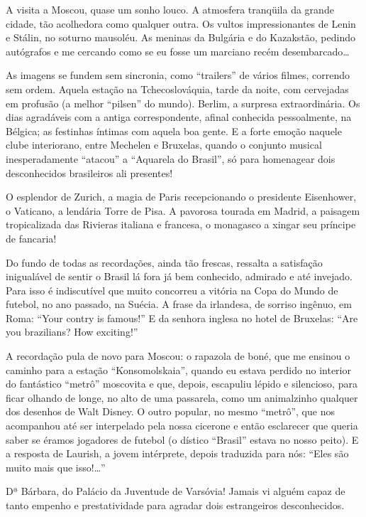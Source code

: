 A visita a Moscou, quase um sonho louco. A atmosfera tranqüila da grande cidade, tão acolhedora como qualquer outra. Os vultos impressionantes de Lenin e Stálin, no soturno mausoléu. As meninas da Bulgária e do Kazakstão, pedindo autógrafos e me cercando como se eu fosse um marciano recém desembarcado\ldots

As imagens se fundem sem sincronia, como “trailers” de vários filmes, correndo sem ordem. Aquela estação na Tchecoslováquia, tarde da noite, com cervejadas em profusão (a melhor “pilsen” do mundo). Berlim, a surpresa extraordinária. Os dias agradáveis com a antiga correspondente, afinal conhecida pessoalmente, na Bélgica; as festinhas íntimas com aquela boa gente. E a forte emoção naquele clube interiorano, entre Mechelen e Bruxelas, quando o conjunto musical inesperadamente “atacou” a “Aquarela do Brasil”, só para homenagear dois desconhecidos brasileiros ali presentes!

O esplendor de Zurich, a magia de Paris recepcionando o presidente Eisenhower, o Vaticano, a lendária Torre de Pisa. A pavorosa tourada em Madrid, a paisagem tropicalizada das Rivieras italiana e francesa, o monagasco a xingar seu príncipe de fancaria!

Do fundo de todas as recordações, ainda tão frescas, ressalta a satisfação inigualável de sentir o Brasil lá fora já bem conhecido, admirado e até invejado. Para isso é indiscutível que muito concorreu a vitória na Copa do Mundo de futebol, no ano passado, na Suécia. A frase da irlandesa, de sorriso ingênuo, em Roma: “Your contry is famous!” E da senhora inglesa no hotel de Bruxelas: “Are you brazilians? How exciting!”

A recordação pula de novo para Moscou: o rapazola de boné, que me ensinou o caminho para a estação “Konsomolskaia”, quando eu estava perdido no interior do fantástico “metrô” moscovita e que, depois, escapuliu lépido e silencioso, para ficar olhando de longe, no alto de uma passarela, como um animalzinho qualquer dos desenhos de Walt Disney. O outro popular, no mesmo “metrô”, que nos acompanhou até ser interpelado pela nossa cicerone e então esclarecer que queria saber se éramos jogadores de futebol (o dístico “Brasil” estava no nosso peito). E a resposta de Laurish, a jovem intérprete, depois traduzida para nós: “Eles são muito mais que isso!\ldots”

Dª Bárbara, do Palácio da Juventude de Varsóvia! Jamais vi alguém capaz de tanto empenho e prestatividade para agradar dois estrangeiros desconhecidos.

